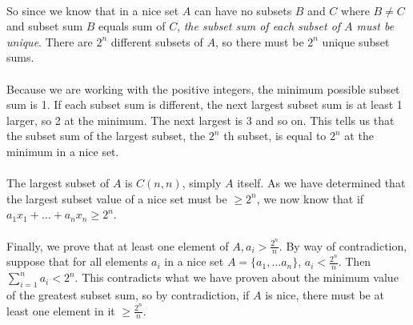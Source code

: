 \documentclass[12pt]{article}
\begin{document}
\begin{enumerate}
\\
So since we know that in a nice set $A$ can have no subsets $B$ and $C$ where $B \neq C$ and subset sum $B$ equals sum of $C$, \emph{the subset sum of each subset of $A$ must be unique}. There are $2^n$ different subsets of $A$, so there must be $2^n$ unique subset sums.\\
\\
Because we are working with the positive integers, the minimum possible subset sum is 1. If each subset sum is different, the next largest subset sum is at least 1 larger, so 2 at the minimum. The next largest is 3 and so on. This tells us that the subset sum of the largest subset, the $2^n$ th subset, is equal to $2^n$ at the minimum in a nice set.\\
\\
The largest subset of $A$ is $C(n, n)$, simply $A$ itself. As we have determined that the largest subset value of a nice set must be $\geq 2^n$, we now know that if  $a_1x_1 + \dots + a_nx_n \geq 2^n$. \\
\\
Finally, we prove that at least one element of $A, a_i > \frac{2^n}{n}$. By way of contradiction, suppose that for all elements $a_i$ in a nice set $A =\{a_1, \dots a_n\}$, $a_i < \frac{2^n}{n}$. Then $\sum\limits_{i=1}^n a_i < 2^n$. This contradicts what we have proven about the minimum value of the greatest subset sum, so by contradiction, if $A$ is nice, there must be at least one element in it $\geq \frac{2^n}{n}$.


\end{enumerate}
\end{document}
